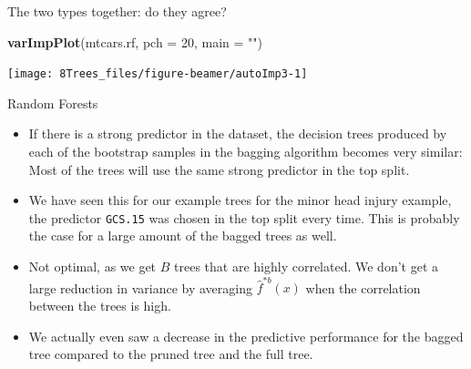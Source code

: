 \documentclass[10pt,ignorenonframetext,]{beamer}
\newenvironment{Shaded}{\begin{snugshade}}{\end{snugshade}}
\newcommand{\KeywordTok}[1]{\textcolor[rgb]{0.13,0.29,0.53}{\textbf{#1}}}
\newcommand{\DataTypeTok}[1]{\textcolor[rgb]{0.13,0.29,0.53}{#1}}
\newcommand{\DecValTok}[1]{\textcolor[rgb]{0.00,0.00,0.81}{#1}}
\newcommand{\StringTok}[1]{\textcolor[rgb]{0.31,0.60,0.02}{#1}}
\newcommand{\NormalTok}[1]{#1}
\begin{document}
\begin{frame}[fragile]

The two types together: do they agree?

\scriptsize

\begin{Shaded}
\begin{Highlighting}[]
\KeywordTok{varImpPlot}\NormalTok{(mtcars.rf, }\DataTypeTok{pch =} \DecValTok{20}\NormalTok{, }\DataTypeTok{main =} \StringTok{""}\NormalTok{)}
\end{Highlighting}
\end{Shaded}

\begin{center}\texttt{[image: 8Trees\_files/figure-beamer/autoImp3-1]} \end{center}

\end{frame}

\begin{frame}[fragile]{Random Forests}

\begin{itemize}
\item
  If there is a strong predictor in the dataset, the decision trees
  produced by each of the bootstrap samples in the bagging algorithm
  becomes very similar: Most of the trees will use the same strong
  predictor in the top split.
\item
  We have seen this for our example trees for the minor head injury
  example, the predictor \texttt{GCS.15} was chosen in the top split
  every time. This is probably the case for a large amount of the bagged
  trees as well.
\item
  Not optimal, as we get \(B\) trees that are highly correlated. We
  don't get a large reduction in variance by averaging
  \(\hat{f}^{*b}(x)\) when the correlation between the trees is high.
\item
  We actually even saw a decrease in the predictive performance for the
  bagged tree compared to the pruned tree and the full tree.
\end{itemize}

\end{frame}
\end{document}
